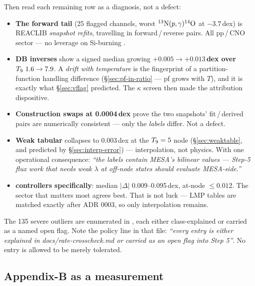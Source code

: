 Then read each remaining row as a diagnosis, not a defect:

\begin{itemize}
\item \textbf{The forward tail} (25 flagged channels, worst
      $\nuc{N}{13}(p,\gamma)\nuc{O}{14}$ at $-3.7$\,dex) is REACLIB
      \emph{snapshot refits}, travelling in forward\,/\,reverse pairs. All
      pp\,/\,CNO sector --- no leverage on Si-burning \Ye.
\item \textbf{DB inverses} show a signed median growing
      \textbf{$+0.005 \to +0.013$\,dex over $\Tn\ 1.6 \to 7.9$}. A \emph{drift
      with temperature} is the fingerprint of a partition-function handling
      difference (\S\ref{sec:pf-in-ratio} --- pf grows with $T$), and it is
      exactly what \S\ref{sec:vflag} predicted. The $\kappa$ screen then made
      the attribution dispositive.
\item \textbf{Construction swaps at 0.0004\,dex} prove the two snapshots'
      fit\,/\,derived pairs are numerically consistent --- only the \emph{labels}
      differ. Not a defect.
\item \textbf{Weak tabular} collapses to 0.003\,dex at the $\Tn = 5$ node
      (\S\ref{sec:weaktable}, and predicted by \S\ref{sec:interp-error}) ---
      interpolation, not physics. With one operational consequence:
      \emph{``the labels contain MESA's bilinear values --- Step-5 flux work
      that needs weak $\lambda$ at off-node states should evaluate MESA-side.''}
\item \textbf{\Ye{} controllers specifically}: median $|\Delta|$
      0.009--0.095\,dex, at-node $\le 0.012$. The sector that matters most
      agrees best. That is not luck --- LMP tables are matched exactly after
      ADR 0003, so only interpolation remains.
\end{itemize}

The 135 severe outliers are enumerated in , each either
class-explained or carried as a named open flag. Note the policy line in that
file: \emph{``every entry is either explained in docs/rate-crosscheck.md or
carried as an open flag into Step 5''}. No entry is allowed to be merely
tolerated.

\subsection{Appendix-B as a measurement}
\label{sec:appendixb}

